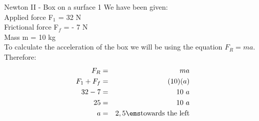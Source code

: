 \begin{wex}{Newton II - Box on a surface 1}
{
We have been given:\\
Applied force F$_{1}$ = 32 N\\
Frictional force F$_{f}$ = - 7 N\\
Mass m = 10 kg\\

To calculate the acceleration of the box we will be using the equation $F_{R} = ma$.
Therefore:
\begin{eqnarray*}
F_{R} &=& ma\\
F_{1} + F_{f} &=& (10)(a)\\
32 - 7 &=& 10~a\\
25 &=& 10~a\\
a &=& 2,5 \ems \mbox{towards the left}\\
\end{eqnarray*}
}
\end{wex}

